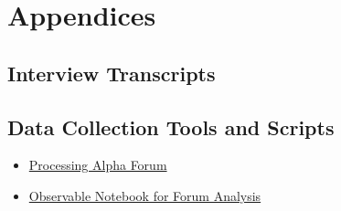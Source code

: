 \documentclass{article}
\begin{document}
\section{Appendices}

\subsection{Interview Transcripts}


\subsection{Data Collection Tools and Scripts}

\begin{itemize}
    \item \href{https://forum.processing.org/alpha/}{Processing Alpha Forum}
    \item \href{https://observablehq.com/d/042b1cf42ea9bb5e}{Observable Notebook for Forum Analysis}
\end{itemize}


\end{document}
